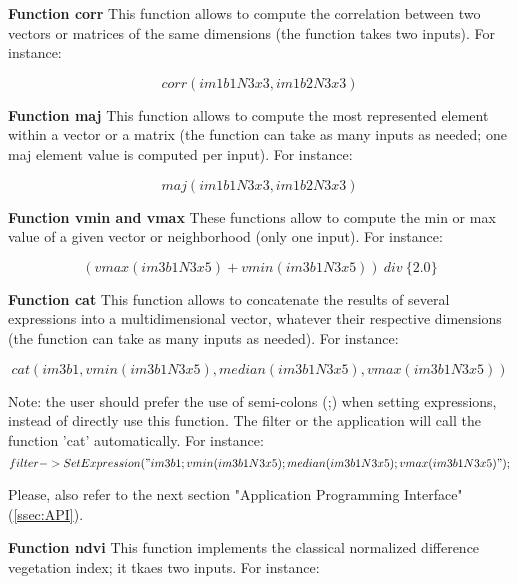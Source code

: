 \textbf{Function corr} \newline
This function allows to compute the correlation between two vectors or matrices of the same dimensions (the function takes two inputs). For instance:

\begin{equation}
	corr(im1b1N3x3,im1b2N3x3)
\end{equation}

\textbf{Function maj} \newline
This function allows to compute the most represented element within a vector or a matrix (the function can take
as many inputs as needed; one maj element value is computed per input). For instance:

\begin{equation}
	maj(im1b1N3x3,im1b2N3x3)
\end{equation}

\textbf{Function vmin and vmax} \newline
These functions allow to compute the min or max value of a given vector or neighborhood (only one input). For instance:

\begin{equation}
	(vmax(im3b1N3x5)+vmin(im3b1N3x5)) ~ div ~ \{2.0\}
\end{equation}

\textbf{Function cat} \newline
This function allows to concatenate the results of several expressions into a multidimensional vector, whatever their respective dimensions (the function can take
as many inputs as needed). For instance:

\begin{equation}
	cat(im3b1,vmin(im3b1N3x5),median(im3b1N3x5),vmax(im3b1N3x5))
\end{equation}

Note: the user should prefer the use of semi-colons (;) when setting expressions, instead of directly use this function.
The filter or the application will call the function 'cat' automatically. For instance:
\begin{equation}
	filter->SetExpression("im3b1 ; vmin(im3b1N3x5) ; median(im3b1N3x5) ; vmax(im3b1N3x5)");
\end{equation} 

Please, also refer to the next section "Application Programming Interface" (\ref{ssec:API}).

\textbf{Function ndvi} \newline
This function implements the classical normalized difference vegetation index; it tkaes two inputs. For instance:

